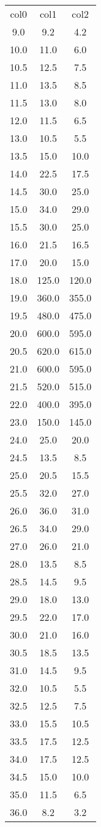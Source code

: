 \begin{table}
\begin{tabular}{ccc}
col0 & col1 & col2 \\
9.0 & 9.2 & 4.2 \\
10.0 & 11.0 & 6.0 \\
10.5 & 12.5 & 7.5 \\
11.0 & 13.5 & 8.5 \\
11.5 & 13.0 & 8.0 \\
12.0 & 11.5 & 6.5 \\
13.0 & 10.5 & 5.5 \\
13.5 & 15.0 & 10.0 \\
14.0 & 22.5 & 17.5 \\
14.5 & 30.0 & 25.0 \\
15.0 & 34.0 & 29.0 \\
15.5 & 30.0 & 25.0 \\
16.0 & 21.5 & 16.5 \\
17.0 & 20.0 & 15.0 \\
18.0 & 125.0 & 120.0 \\
19.0 & 360.0 & 355.0 \\
19.5 & 480.0 & 475.0 \\
20.0 & 600.0 & 595.0 \\
20.5 & 620.0 & 615.0 \\
21.0 & 600.0 & 595.0 \\
21.5 & 520.0 & 515.0 \\
22.0 & 400.0 & 395.0 \\
23.0 & 150.0 & 145.0 \\
24.0 & 25.0 & 20.0 \\
24.5 & 13.5 & 8.5 \\
25.0 & 20.5 & 15.5 \\
25.5 & 32.0 & 27.0 \\
26.0 & 36.0 & 31.0 \\
26.5 & 34.0 & 29.0 \\
27.0 & 26.0 & 21.0 \\
28.0 & 13.5 & 8.5 \\
28.5 & 14.5 & 9.5 \\
29.0 & 18.0 & 13.0 \\
29.5 & 22.0 & 17.0 \\
30.0 & 21.0 & 16.0 \\
30.5 & 18.5 & 13.5 \\
31.0 & 14.5 & 9.5 \\
32.0 & 10.5 & 5.5 \\
32.5 & 12.5 & 7.5 \\
33.0 & 15.5 & 10.5 \\
33.5 & 17.5 & 12.5 \\
34.0 & 17.5 & 12.5 \\
34.5 & 15.0 & 10.0 \\
35.0 & 11.5 & 6.5 \\
36.0 & 8.2 & 3.2 \\
\end{tabular}
\end{table}
